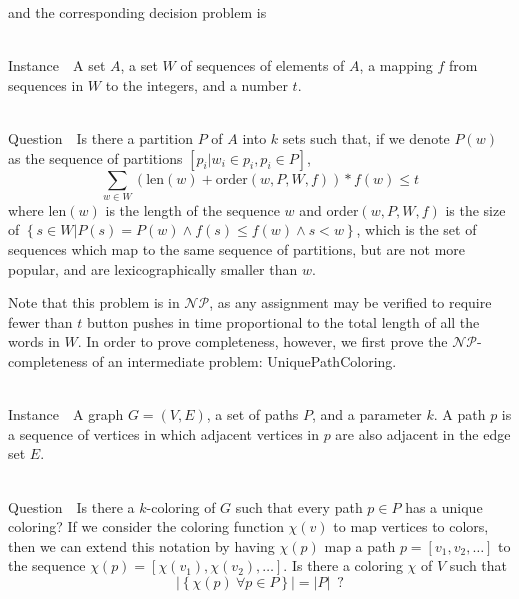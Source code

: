 \documentclass[runningheads]{llncs}
\newcommand{\NP}{\ensuremath{\mathcal{NP}}}
\newcommand{\Instance}{{\sc Instance~}}
\newcommand{\Question}{~\\
{\sc Question~}}
\begin{document}
and the corresponding decision problem is

\begin{prob}~\\
\label{minstrokesdecision}
\Instance\ A set $A$, a set $W$ of sequences of elements of $A$, a mapping $f$ from sequences in $W$ to the integers, and a number $t$.

\Question\ Is there a partition $P$ of $A$ into $k$ sets such that, if we denote $P(w)$ as the sequence of partitions $[p_i | w_i \in p_i, p_i \in P]$,
$$\sum_{w\in W} (\mathrm{len}(w)+\mathrm{order}(w,P,W,f)) * f(w) \le t$$
where len$(w)$ is the length of the sequence $w$ and order$(w,P,W,f)$ is the size of $\left\{s\in W | P(s) = P(w) \land f(s) \le f(w) \land s < w \right\}$, which is the set of sequences which map to the same sequence of partitions, but are not more popular, and are lexicographically smaller than $w$.
\end{prob}

Note that this problem is in \NP, as any assignment may be verified to require
fewer than $t$ button pushes in time proportional to the total length of all
the words in $W$.  In order to prove completeness, however, we first prove the
\NP-completeness of an intermediate problem: {\sc UniquePathColoring}.

\begin{prob}[{\sc UniquePathColoring}]~\\
\label{upcolor}
\Instance\ A graph $G=(V,E)$, a set of paths $P$, and a parameter $k$.  A path
$p$ is a sequence of vertices in which adjacent vertices in $p$ are also
adjacent in the edge set $E$.

\Question\ Is there a $k$-coloring of $G$ such that every path $p\in P$ has a
unique coloring?  If we consider the coloring function $\chi(v)$ to map
vertices to colors, then we can extend this notation by having $\chi(p)$ map a
path $p = [ v_1, v_2, \ldots ]$ to the sequence $\chi(p) = [ \chi(v_1),
\chi(v_2), \ldots ]$.  Is there a coloring $\chi$ of $V$ such that 
    $$|\left\{ \chi(p)~\forall p \in P\right\}| = |P|\enspace ?$$
\end{prob}
\end{document}
